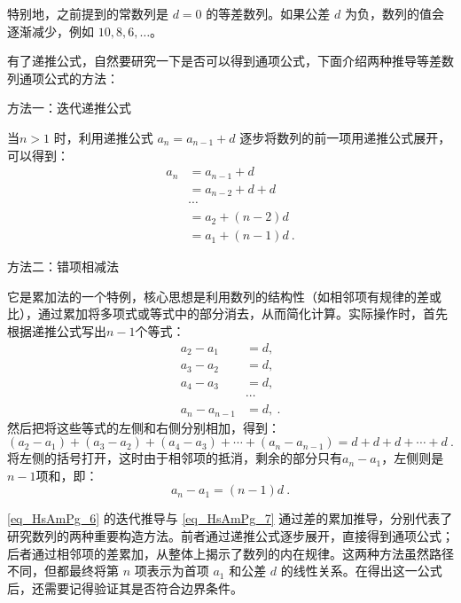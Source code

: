 特别地，之前提到的常数列是 $d = 0$ 的等差数列。如果公差 $d$ 为负，数列的值会逐渐减少，例如 $10, 8, 6, \dots$。

有了递推公式，自然要研究一下是否可以得到通项公式，下面介绍两种推导等差数列通项公式的方法：

方法一：迭代递推公式

当$n>1$ 时，利用递推公式  $a_n = a_{n-1} + d$ 逐步将数列的前一项用递推公式展开，可以得到：
\begin{equation}\label{eq_HsAmPg_6}
\begin{aligned}
a_n &= a_{n-1} + d \\
&= a_{n-2}+d + d\\
&\cdots \\
&= a_2 + (n-2)d\\
&=  a_1 + (n-1)d~.
\end{aligned}
\end{equation}

方法二：错项相减法

它是累加法的一个特例，核心思想是利用数列的结构性（如相邻项有规律的差或比），通过累加将多项式或等式中的部分消去，从而简化计算。实际操作时，首先根据递推公式写出$n-1$个等式：
\begin{equation}\label{eq_HsAmPg_7}
\begin{aligned}
a_2-a_1 &= d,\\
a_3-a_2 &= d,\\
a_4-a_3 &= d,\\
&\cdots \\
a_n-a_{n-1} &= d,~.
\end{aligned}
\end{equation}
然后把将这些等式的左侧和右侧分别相加，得到：
\begin{equation}
(a_2 - a_1) + (a_3 - a_2) + (a_4 - a_3) + \cdots + (a_n - a_{n-1}) = d + d +d+ \cdots + d~.
\end{equation}
将左侧的括号打开，这时由于相邻项的抵消，剩余的部分只有$a_n-a_1$，左侧则是$n-1$项和，即：
\begin{equation}\label{eq_HsAmPg_8}
a_n -a_1=(n-1)d~.
\end{equation}

\autoref{eq_HsAmPg_6} 的迭代推导与 \autoref{eq_HsAmPg_7} 通过差的累加推导，分别代表了研究数列的两种重要构造方法。前者通过递推公式逐步展开，直接得到通项公式；后者通过相邻项的差累加，从整体上揭示了数列的内在规律。这两种方法虽然路径不同，但都最终将第  $n $ 项表示为首项 $ a_1$  和公差  $d$  的线性关系。在得出这一公式后，还需要记得验证其是否符合边界条件。

